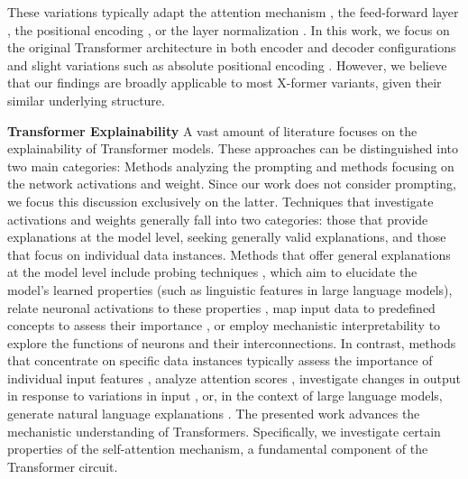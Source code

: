 These variations typically adapt the attention mechanism \cite{Guo_Qiu_Xue_Zhang_2019, Wang_Li_Khabsa_Fang_Ma_2020, Beltagy_Peters_Cohan_2020}, the feed-forward layer \cite{Yang_Wang_Shi_Tadepalli_Lee_Tu_2020, Fedus_Zoph_Shazeer_2022}, the positional encoding \cite{devlinBERTPretrainingDeep2019, Raffel_T5_2020}, or the layer normalization \cite{Nguyen_Salazar_2019, Shen_Yao_Gholami_Mahoney_Keutzer_2020}.
In this work, we focus on the original Transformer architecture in both encoder and decoder configurations and slight variations such as absolute positional encoding \cite{devlinBERTPretrainingDeep2019}. However, we believe that our findings are broadly applicable to most X-former variants, given their similar underlying structure.

\textbf{Transformer Explainability} A vast amount of literature focuses on the explainability of Transformer models. These approaches can be distinguished into two main categories: Methods analyzing the prompting and methods focusing on the network activations and weight.
Since our work does not consider prompting, we focus this discussion exclusively on the latter. Techniques that investigate activations and weights generally fall into two categories: those that provide explanations at the model level, seeking generally valid explanations, and those that focus on individual data instances.
Methods that offer general explanations at the model level include probing techniques \cite{Peters_Neumann_2018, Tenney_Xia_2019, Maudslay_Cotterell_2021}, which aim to elucidate the model's learned properties (such as linguistic features in large language models), relate neuronal activations to these properties \cite{Dalvi_Durrani_2019, Torroba_Hennigen_2020, Antverg_Belinkov_2022}, map input data to predefined concepts to assess their importance \cite{Kim_Wattenberg_2018, Mu_Andreas_2020}, or employ mechanistic interpretability \cite{bricken2023monosemanticity, Geva_Schuster_2021, Meng_Bau_2022, Geva_Caciularu_2022, Lieberum_Rahtz_2023} to explore the functions of neurons and their interconnections. In contrast, methods that concentrate on specific data instances typically assess the importance of individual input features \cite{Wu_Chen_2020, Lundstrom_Huang_2022}, analyze attention scores \cite{Hoover_Strobelt_2020, Barkan_2021, Yeh_Chen_2023}, investigate changes in output in response to variations in input \cite{Jin_Jin_2020, Wang_Xu_2022}, or, in the context of large language models, generate natural language explanations \cite{Rajani_McCann_2019}. The presented work advances the mechanistic understanding of Transformers. Specifically, we investigate certain properties of the self-attention mechanism, a fundamental component of the Transformer circuit.
